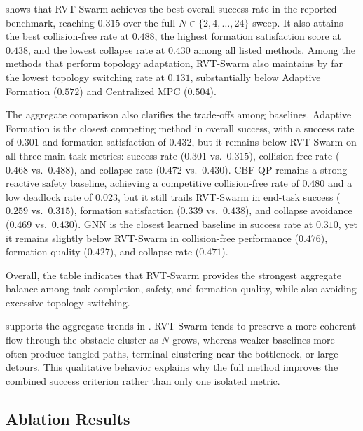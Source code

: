\documentclass{ieeeaccess}
\begin{document}
 shows that RVT-Swarm achieves the best overall
success rate in the reported benchmark, reaching $0.315$ over the full
$N\in\{2,4,\dots,24\}$ sweep. It also attains the best collision-free
rate at $0.488$, the highest formation satisfaction score at $0.438$,
and the lowest collapse rate at $0.430$ among all listed methods.
Among the methods that perform topology adaptation, RVT-Swarm also
maintains by far the lowest topology switching rate at $0.131$,
substantially below Adaptive Formation ($0.572$) and Centralized MPC
($0.504$).

The aggregate comparison also clarifies the trade-offs among baselines.
Adaptive Formation is the closest competing method in overall success,
with a success rate of $0.301$ and formation satisfaction of $0.432$,
but it remains below RVT-Swarm on all three main task metrics: success
rate ($0.301$ vs.\ $0.315$), collision-free rate ($0.468$ vs.\ $0.488$),
and collapse rate ($0.472$ vs.\ $0.430$). CBF-QP remains a strong
reactive safety baseline, achieving a competitive collision-free rate of
$0.480$ and a low deadlock rate of $0.023$, but it still trails
RVT-Swarm in end-task success ($0.259$ vs.\ $0.315$), formation
satisfaction ($0.339$ vs.\ $0.438$), and collapse avoidance
($0.469$ vs.\ $0.430$). GNN is the closest learned baseline in
success rate at $0.310$, yet it remains slightly below RVT-Swarm in
collision-free performance ($0.476$), formation quality ($0.427$), and
collapse rate ($0.471$).

Overall, the table indicates that RVT-Swarm provides the strongest
aggregate balance among task completion, safety, and formation quality,
while also avoiding excessive topology switching.

 supports the aggregate trends in
. RVT-Swarm tends to preserve a more coherent
flow through the obstacle cluster as $N$ grows, whereas weaker baselines
more often produce tangled paths, terminal clustering near the
bottleneck, or large detours. This qualitative behavior explains why
the full method improves the combined success criterion rather than only
one isolated metric.

\subsection{Ablation Results}
\label{sec:ablation}
\end{document}
